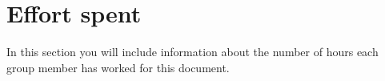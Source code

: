 \section{Effort spent}
\label{sect:effortspent}

In this section you will include information about the number of hours each
group member has worked for this document.